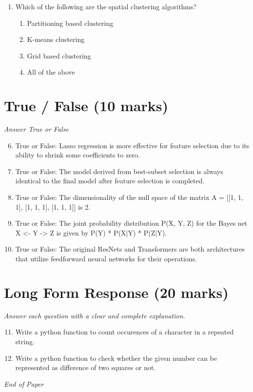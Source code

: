 \documentclass[12pt]{article}
\begin{document}
\begin{enumerate}[label=\arabic*.]
\begin{enumerate}[label=(\alph*)]
    \item 7
    \item 15
\end{enumerate}
\item Which of the following are the spatial clustering algorithms?
\begin{enumerate}[label=(\alph*)]
    \item Partitioning based clustering
    \item K-means clustering
    \item Grid based clustering
    \item All of the above
\end{enumerate}
\end{enumerate}

\section*{True / False (10 marks)}
\textit{Answer True or False}
\begin{enumerate}[label=\arabic*.]
\setcounter{enumi}{5}
\item True or False: Lasso regression is more effective for feature selection due to its ability to shrink some coefficients to zero.
\item True or False: The model derived from best-subset selection is always identical to the final model after feature selection is completed.
\item True or False: The dimensionality of the null space of the matrix A = [[1, 1, 1], [1, 1, 1], [1, 1, 1]] is 2.
\item True or False: The joint probability distribution P(X, Y, Z) for the Bayes net X \textless{}- Y -\textgreater{} Z is given by P(Y) * P(X|Y) * P(Z|Y).
\item True or False: The original ResNets and Transformers are both architectures that utilize feedforward neural networks for their operations.
\end{enumerate}

\section*{Long Form Response (20 marks)}
\textit{Answer each question with a clear and complete explanation.}
\begin{enumerate}[label=\arabic*.]
\setcounter{enumi}{10}
\item Write a python function to count occurences of a character in a repeated string.
\item Write a python function to check whether the given number can be represented as difference of two squares or not.
\end{enumerate}

\vfill
\noindent\textit{End of Paper}
\end{document}
